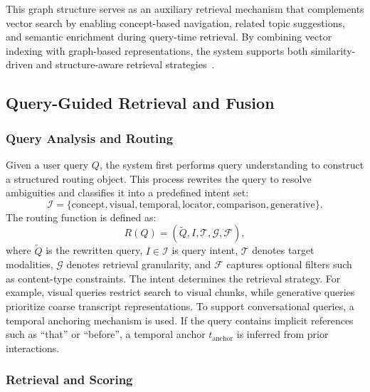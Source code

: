 \documentclass[conference]{IEEEtran}
\begin{document}
    This graph structure serves as an auxiliary retrieval mechanism that complements vector search by enabling concept-based navigation, related topic suggestions, and semantic enrichment during query-time retrieval. By combining vector indexing with graph-based representations, the system supports both similarity-driven and structure-aware retrieval strategies~\cite{edge2024local,rashmi2024multimodal,park2024m3kg}.

    \subsection{Query-Guided Retrieval and Fusion}

    \subsubsection{Query Analysis and Routing}

    Given a user query $Q$, the system first performs query understanding to construct a structured routing object. This process rewrites the query to resolve ambiguities and classifies it into a predefined intent set:
    \begin{equation}
    \mathcal{I} = \{\text{concept}, \text{visual}, \text{temporal}, \text{locator}, \text{comparison}, \text{generative}\}.
    \end{equation}
    The routing function is defined as:
    \begin{equation}
    R(Q) = \left(\tilde{Q}, I, \mathcal{T}, \mathcal{G}, \mathcal{F}\right),
    \end{equation}
    where $\tilde{Q}$ is the rewritten query, $I \in \mathcal{I}$ is query intent, $\mathcal{T}$ denotes target modalities, $\mathcal{G}$ denotes retrieval granularity, and $\mathcal{F}$ captures optional filters such as content-type constraints. The intent determines the retrieval strategy. For example, visual queries restrict search to visual chunks, while generative queries prioritize coarse transcript representations. To support conversational queries, a temporal anchoring mechanism is used. If the query contains implicit references such as ``that'' or ``before'', a temporal anchor $t_{\text{anchor}}$ is inferred from prior interactions.

    \subsubsection{Retrieval and Scoring}
\end{document}
